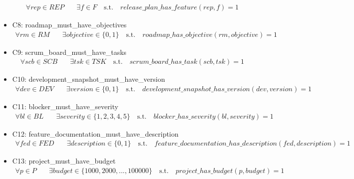 \documentclass{article}
\begin{document}
\begin{itemize}
        \begin{align*}
            \forall rep \in REP \quad &\exists f \in F \quad \text{s.t.} \quad release\_plan\_has\_feature(rep, f) = 1
        \end{align*}
    \item C8: roadmap\_must\_have\_objectives
        \begin{align*}
            \forall rm \in RM \quad &\exists objective \in \{0, 1\} \quad \text{s.t.} \quad roadmap\_has\_objective(rm, objective) = 1
        \end{align*}
    \item C9: scrum\_board\_must\_have\_tasks
        \begin{align*}
            \forall scb \in SCB \quad &\exists tsk \in TSK \quad \text{s.t.} \quad scrum\_board\_has\_task(scb, tsk) = 1
        \end{align*}
    \item C10: development\_snapshot\_must\_have\_version
        \begin{align*}
            \forall dev \in DEV \quad &\exists version \in \{0, 1\} \quad \text{s.t.} \quad development\_snapshot\_has\_version(dev, version) = 1
        \end{align*}
    \item C11: blocker\_must\_have\_severity
        \begin{align*}
            \forall bl \in BL \quad &\exists severity \in \{1, 2, 3, 4, 5\} \quad \text{s.t.} \quad blocker\_has\_severity(bl, severity) = 1
        \end{align*}
    \item C12: feature\_documentation\_must\_have\_description
        \begin{align*}
            \forall fed \in FED \quad &\exists description \in \{0, 1\} \quad \text{s.t.} \quad feature\_documentation\_has\_description(fed, description) = 1
        \end{align*}
    \item C13: project\_must\_have\_budget
        \begin{align*}
            \forall p \in P \quad &\exists budget \in \{1000, 2000, ..., 100000\} \quad \text{s.t.} \quad project\_has\_budget(p, budget) = 1
        \end{align*}
\end{itemize}
\end{document}
